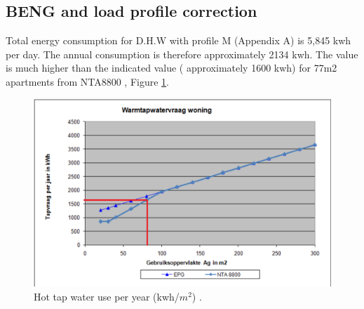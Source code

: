 


\subsection{BENG and load profile correction}

Total energy consumption for D.H.W with profile M \cite{VERORDENING} (Appendix A) is 5,845 kwh per day. The annual consumption is therefore approximately 2134 kwh. The value is much higher than the indicated value ( approximately 1600 kwh) for 77m2 apartments from NTA8800 \cite{NTA8800}, Figure \ref{fig:htwyear}.

\begin{figure}[H]
\centering
\includegraphics[width=1\columnwidth]{pictures/NTA_8800_DHW.png}
\caption[Short title]{Hot tap water use per year (kwh/$m^2$) \cite{NTA8800}.}
\label{fig:htwyear}
\end{figure}

